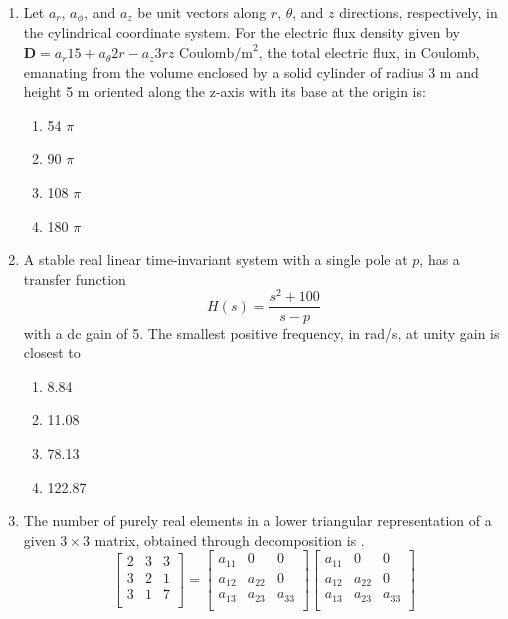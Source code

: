 \documentclass[journal,12pt,onecolumn]{IEEEtran}
\theoremstyle{remark}
\begin{document}
\begin{enumerate}
    \item Let $a_r$, $a_\phi$, and $a_z$ be unit vectors along $r$, $\theta$, and $z$ directions, respectively, in the cylindrical coordinate system. For the electric flux density given by
    $
    \mathbf{D} = a_r 15 + a_\theta 2r - a_z 3rz \text{ Coulomb/m}^2\text{}
    $,
    the total electric flux, in Coulomb, emanating from the volume enclosed by a solid cylinder of radius 3 m and height 5 m oriented along the z-axis with its base at the origin is:
    \begin{enumerate}
        \item 54 $\pi$
        \item 90 $\pi$
        \item 108 $\pi$
        \item 180 $\pi$
    \end{enumerate}
    \item A stable real linear time-invariant system with a single pole at $p$, has a transfer function
    $$
    H(s) = \frac{s^2 + 100}{s-p}
    $$
    with a dc gain of 5. The smallest positive frequency, in rad/s, at unity gain is closest to
    \begin{enumerate}
        \item 8.84
        \item 11.08
        \item 78.13
        \item 122.87
    \end{enumerate}
    \item The number of purely real elements in a lower triangular representation of a given $3 \times 3$ matrix, obtained through decomposition is {\underline{\hspace{1cm}}}.
    \[
\begin{bmatrix}
2 & 3 & 3 \\
3 & 2 & 1 \\
3 & 1 & 7 \\
\end{bmatrix}
=
\begin{bmatrix}
a_{11} & 0 & 0 \\
a_{12} & a_{22} & 0 \\
a_{13} & a_{23} & a_{33} \\
\end{bmatrix}
\begin{bmatrix}
a_{11} & 0 & 0 \\
a_{12} & a_{22} & 0 \\
a_{13} & a_{23} & a_{33} \\

\end{bmatrix}\]
\end{enumerate}
\end{document}
